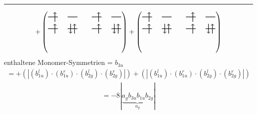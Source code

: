 \documentclass{article}
\begin{document}
\hrule\newpage 
\[ +\left(\text{\begin{tikzpicture}
    \draw[thick] (0,0) -- (0.5,0); %
    \draw[thick] (1,0) -- (1.5,0); %
    \draw[thick] (0,-0.6) -- (0.5,-0.6); %
    \draw[thick] (1,-0.6) -- (1.5,-0.6); %
\draw[->, thick] (0.35, -0.25) -- (0.35, 0.25); 
\draw[-> , thick] (0.35, -0.85) -- (0.35, -0.35); 
 \draw[-> , thick] (1.35, -0.85) -- (1.35, -0.35); 
\draw[<- , thick] (1.15, -0.85) -- (1.15, -0.35); 
\end{tikzpicture}\qquad \begin{tikzpicture}
    \draw[thick] (0,0) -- (0.5,0); %
    \draw[thick] (1,0) -- (1.5,0); %
    \draw[thick] (0,-0.6) -- (0.5,-0.6); %
    \draw[thick] (1,-0.6) -- (1.5,-0.6); %
\draw[->, thick] (0.35, -0.25) -- (0.35, 0.25); 
\draw[-> , thick] (0.35, -0.85) -- (0.35, -0.35); 
 \draw[-> , thick] (1.35, -0.85) -- (1.35, -0.35); 
\draw[<- , thick] (1.15, -0.85) -- (1.15, -0.35); 
\end{tikzpicture}}\right)+\left(\text{\begin{tikzpicture}
    \draw[thick] (0,0) -- (0.5,0); %
    \draw[thick] (1,0) -- (1.5,0); %
    \draw[thick] (0,-0.6) -- (0.5,-0.6); %
    \draw[thick] (1,-0.6) -- (1.5,-0.6); %
\draw[->, thick] (0.35, -0.25) -- (0.35, 0.25); 
\draw[-> , thick] (0.35, -0.85) -- (0.35, -0.35); 
 \draw[-> , thick] (1.35, -0.85) -- (1.35, -0.35); 
\draw[<- , thick] (1.15, -0.85) -- (1.15, -0.35); 
\end{tikzpicture}\qquad \begin{tikzpicture}
    \draw[thick] (0,0) -- (0.5,0); %
    \draw[thick] (1,0) -- (1.5,0); %
    \draw[thick] (0,-0.6) -- (0.5,-0.6); %
    \draw[thick] (1,-0.6) -- (1.5,-0.6); %
\draw[->, thick] (0.35, -0.25) -- (0.35, 0.25); 
\draw[-> , thick] (0.35, -0.85) -- (0.35, -0.35); 
 \draw[-> , thick] (1.35, -0.85) -- (1.35, -0.35); 
\draw[<- , thick] (1.15, -0.85) -- (1.15, -0.35); 
\end{tikzpicture}}\right)\]enthaltene Monomer-Symmetrien = $b_{3u}$\begin{multline*}=+\left(\left|(b_{1u}^{l}) \cdot (b_{1u}^{r}) \cdot (b_{2g}^{l}) \cdot (b_{2g}^{r})\right|\right)+\left(\left|(b_{1u}^{l}) \cdot (b_{1u}^{r}) \cdot (b_{2g}^{l}) \cdot (b_{2g}^{r})\right|\right)\end{multline*}
\begin{multline*}
=-8\left|\underbrace{a_{g} b_{3u} b_{1u} b_{2g}}_{a_{g}}\right|
\end{multline*}
\\\\
\end{document}
